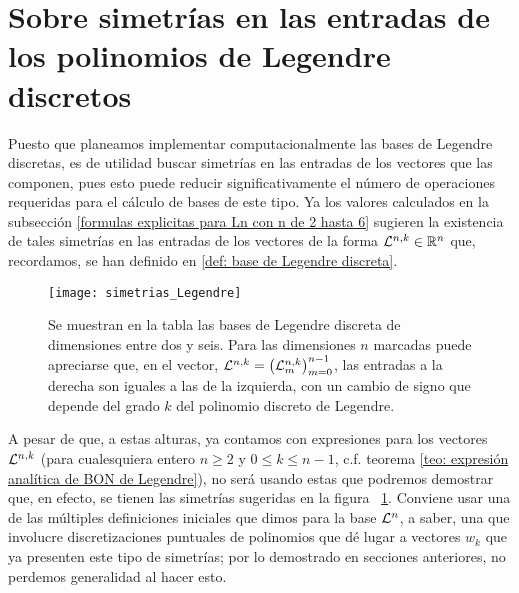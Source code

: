 \section{Sobre simetrías en las entradas de los polinomios de Legendre discretos}
\label{section: sobre simetrias en las entradas de los poliomios discretos de Legendre}
Puesto que planeamos implementar computacionalmente
las bases de Legendre discretas, es de utilidad 
buscar simetrías en las entradas de los vectores que las 
componen, pues esto puede reducir significativamente
el número de operaciones requeridas para el cálculo 
de bases de este tipo.
Ya los valores calculados
en la subsección 
\ref{formulas explicitas para Ln con n de 2 hasta 6}
sugieren 
la existencia de tales simetrías en las entradas 
de los vectores de la forma $\mathcal{L}^{n,k} \in \mathbb{R}^{n}$
que, recordamos, se han definido en 
\ref{def: base de Legendre discreta}.


\begin{figure}[H] \label{fig: simetrias entradas Legendre}
\centering\captionsetup{format = hang}
	\begin{measuredfigure}
		\texttt{[image: simetrias\_Legendre]} 
		\caption{
		Se muestran en la tabla las bases de Legendre
		discreta de dimensiones entre dos y seis. 		
		Para las dimensiones $n$ marcadas
		puede apreciarse que, en el vector,
		 $\mathcal{L}^{n,k} = \left( \mathcal{L}^{n,k}_{m} \right)_{m=0}^{n-1}$,
		las entradas a la derecha son iguales a las de la izquierda,
		con un cambio de signo que depende del
		grado $k$ del polinomio discreto de Legendre.}
		\label{fig: simetrias entradas Legendre}
 	\end{measuredfigure} 
 \end{figure}

A pesar de que, a estas alturas, ya contamos
con expresiones para los vectores $\mathcal{L}^{n,k}$
(para cualesquiera entero $n \geq 2$ y $0 \leq k \leq n-1$,
c.f. teorema \ref{teo: expresión analítica de BON de Legendre}),
no será usando estas que podremos demostrar que, en efecto,
se tienen las simetrías sugeridas en la figura
~\ref{fig: simetrias entradas Legendre}.
Conviene
usar una de las múltiples definiciones iniciales
que dimos para la base $\mathcal{L}^{n}$, a saber, una
que involucre discretizaciones puntuales de polinomios 
que dé lugar a vectores $w_{k}$ que ya presenten 
este tipo de simetrías; por lo demostrado en secciones anteriores,
no perdemos generalidad al hacer esto. 



